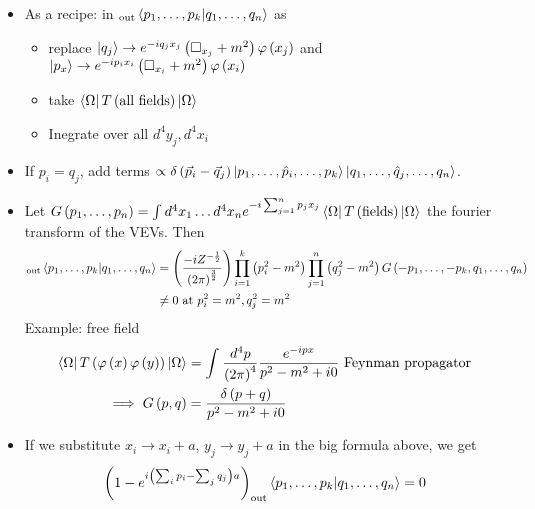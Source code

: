 \documentclass{report}
\begin{document}
\begin{itemize}
  \item As a recipe: in $_\text{out} \bra{p_1,\ldots,p_k} \ket{q_1,\ldots,q_n} $ as
    \begin{itemize}
      \item replace 
        $\ket{q_j} \to e^{-i q_j x_j} \left( \square_{x_j} + m^2  \right) \varphi\left( x_j \right) $
        and 
        $\ket{p_x} \to e^{-i p_i x_i} \left( \square_{x_i} + m^2  \right) \varphi\left( x_i \right) $
      \item take $\bra{\Omega} T \left( \text{all fields} \right) \ket{\Omega} $
      \item Inegrate over all $d^{4} y_j, d^{4} x_i$
    \end{itemize}
  \item If $p_i = q_j$, add terms $\propto \delta\left( \vec{p}_i - \vec{q}_j \right) \ket{p_1,\ldots, \hat{p}_i, \ldots,p_k } \ket{q_1,\ldots,\hat{q}_j, \ldots,q_n} $.
  \item Let $G\left( p_1,\ldots, p_n \right) = \int_{}^{} d^{4} x_1 \ldots d^{4} x_n e^{-i \sum_{j=1}^{n} p_j x_j } \bra{\Omega} T\left( \text{fields} \right) \ket{\Omega}  $ the fourier transform of the VEVs. Then
    \begin{align*}
      _\text{out} \bra{p_1,\ldots,p_k} \ket{q_1,\ldots,q_n} &= \left( \frac{-i Z^{-\frac{1}{2} } }{\left( 2\pi \right) ^{\frac{3}{2} } }  \right) \prod_{i=1}^{k} \left( p_i^2 - m^2 \right) \prod_{j=1}^{n} \left( q_j^2 - m^2 \right) G\left( -p_1,\ldots,-p_k, q_1,\ldots,q_n  \right)  \\
      &\neq 0 \text{  at } p_i^2 = m^2, q_j^2 = m^2 
    \end{align*}
    Example: free field
    \begin{align*}
      \bra{\Omega} T\left( \varphi\left( x \right) \varphi\left( y \right)  \right) \ket{\Omega} &= \int_{}^{} \frac{d^{4} p}{\left( 2\pi \right) ^{4} } \frac{e^{-ipx} }{p^2 - m^2 + i 0} \text{  Feynman propagator}   \\
      \implies G\left( p,q \right) &= \frac{\delta\left( p+q \right) }{ p^2 - m^2 + i 0 }
    \end{align*}
  \item If we substitute $x_i \to x_i + a$, $y_j \to y_j + a$ in the big formula above, we get 
    \begin{align*}
      \left( 1- e^{i\left( \sum_{i}^{} p_i - \sum_{j}^{} q_j   \right) a} \right) _\text{out}\bra{p_1, \ldots, p_k} \ket{q_1,\ldots,q_n } &= 0 \\

\end{align*}
\end{itemize}
\end{document}

